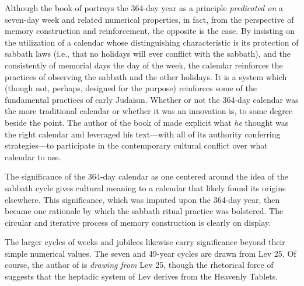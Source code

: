 Although the book of \jub portrays the 364-day year as a principle \emph{predicated on} a seven-day week and related numerical properties, in fact, from the perspective of memory construction and reinforcement, the opposite is the case. By insisting on the utilization of a calendar whose distinguishing characteristic is its protection of sabbath laws (i.e., that no holidays will ever conflict with the sabbath), and the consistently of memorial days \visavis the day of the week, the calendar reinforces the practices of observing the sabbath and the other holidays. It is a system which (though not, perhaps, designed for the purpose) reinforces some of the fundamental practices of early Judaism.
Whether or not the 364-day calendar was the more traditional calendar or whether it was an innovation is, to some degree beside the point. The author of the book of \jub made explicit what \emph{he} thought was the right calendar and leveraged his text---with all of its authority conferring strategies---to participate in the contemporary cultural conflict over what calendar to use. 

The significance of the 364-day calendar as one centered around the idea of the sabbath cycle gives cultural meaning to a calendar that likely found its origins elsewhere. %
This significance, which was imputed upon the 364-day year, then became one rationale by which the sabbath ritual practice was bolstered. The circular and iterative process of memory construction is clearly on display.

The larger cycles of weeks and jubilees likewise carry significance beyond their simple numerical values. The seven and 49-year cycles are drawn from Lev 25. Of course, the author of \jub is \emph{drawing from} Lev 25, though the rhetorical force of \jub suggests that the heptadic system of Lev derives from the Heavenly Tablets. 


